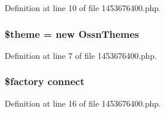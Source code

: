 Definition at line 10 of file 1453676400.\+php.

\subsubsection[{\texorpdfstring{\$theme}{$theme}}]{\setlength{\rightskip}{0pt plus 5cm}\$theme = new {\bf Ossn\+Themes}}\hypertarget{1453676400_8php_a1ae541f7fe1c5e21cb4535f88ec9e9dc}{}\label{1453676400_8php_a1ae541f7fe1c5e21cb4535f88ec9e9dc}


Definition at line 7 of file 1453676400.\+php.

\subsubsection[{\texorpdfstring{connect}{connect}}]{\setlength{\rightskip}{0pt plus 5cm}\$factory connect}\hypertarget{1453676400_8php_a3fdbedd7713e458f25fcf7dc1f562a3d}{}\label{1453676400_8php_a3fdbedd7713e458f25fcf7dc1f562a3d}


Definition at line 16 of file 1453676400.\+php.

